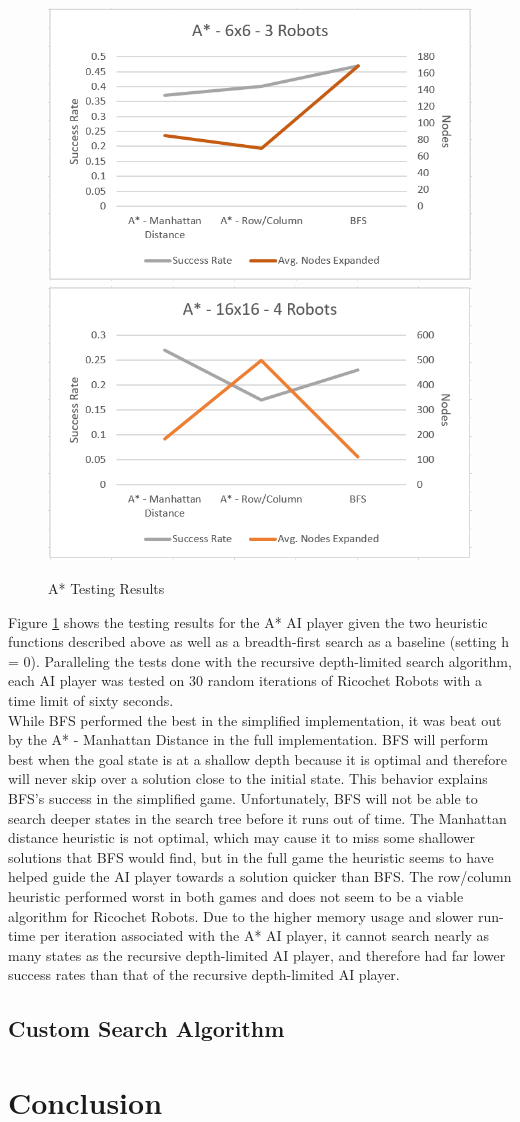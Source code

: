 \documentclass[a4paper,10pt]{article}
\begin{document}
  \begin{figure}[h!]
    \centering
    \includegraphics[width=0.45\linewidth]{figures/img3.PNG}
    \includegraphics[width=0.45\linewidth]{figures/img4.PNG}
    \caption{A* Testing Results}
    \label{fig:A*_chart}
  \end{figure}

  Figure \ref{fig:A*_chart} shows the testing results for the A* AI player given the two heuristic functions described above as well as a breadth-first search as a
  baseline (setting h = 0).  Paralleling the tests done with the recursive depth-limited search algorithm, each AI player was tested on 30 random iterations of Ricochet
  Robots with a time limit of sixty seconds. \\

  While BFS performed the best in the simplified implementation, it was beat out by the A* - Manhattan Distance in the full implementation.  BFS will perform best when
  the goal state is at a shallow depth because it is optimal and therefore will never skip over a solution close to the initial state.  This behavior explains BFS's
  success in the simplified game.  Unfortunately, BFS will not be able to search deeper states in the search tree before it runs out of time.  The Manhattan distance
  heuristic is not optimal, which may cause it to miss some shallower solutions that BFS would find, but in the full game the heuristic seems to have helped guide the AI
  player towards a solution quicker than BFS.  The row/column heuristic performed worst in both games and does not seem to be a viable algorithm for Ricochet Robots.
  Due to the higher memory usage and slower run-time per iteration associated with the A* AI player, it cannot search nearly as many states as the recursive depth-limited
  AI player, and therefore had far lower success rates than that of the recursive depth-limited AI player.


  \subsection{Custom Search Algorithm}


\section{Conclusion}
\end{document}
